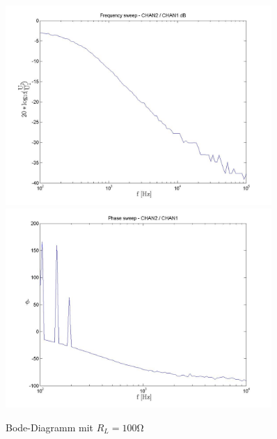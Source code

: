 \documentclass[10pt]{scrreprt}
\begin{document}
        \begin{center}
            \begin{figure}[H]
                \centering
                \includegraphics[width=0.9\textwidth]{SchweepVpp_100Ohm_frequencysweep_ylogxlog.jpg}
                \includegraphics[width=0.9\textwidth]{100OhmKraids_phasesweep_xlog.jpg}
                \caption{Bode-Diagramm mit $R_L = 100\si{\ohm}$}
            \end{figure}


\end{center}
\end{document}
